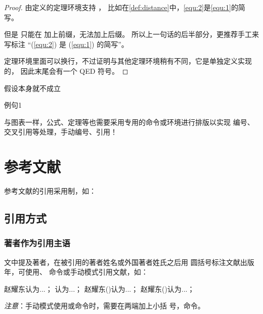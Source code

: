 \begin{proof}
由定义的定理环境支持 ，
比如在\autoref{def:distance}中，\autoref{equ:2}是\autoref{equ:1}的简写。

但是  只能在  加上前缀，无法加上后缀。
所以上一句话的后半部分，更推荐手工来写标注 “(\ref{equ:2}) 是 (\ref{equ:1}) 的简写”。

定理环境里面可以换行，不过证明与其他定理环境稍有不同，它是单独定义实现的，
因此末尾会有一个 QED 符号。
\end{proof}

\begin{assumption}
\label{assume:fail}
假设本身就不成立
\end{assumption}

\begin{lines}
\label{s1}
例句1
\end{lines}

与图表一样，公式、定理等也需要采用专用的命令或环境进行排版以实现
编号、交叉引用等处理，手动编号、引用！

\section{参考文献}
\label{sec:bib}
参考文献的引用采用制，如：

\subsection{引用方式}
\subsubsection{著者作为引用主语}

文中提及著者，在被引用的著者姓名或外国著者姓氏之后用
圆括号标注文献出版年，可使用、
命令或手动模式引用文献，如：

\begin{center}
  \begin{minipage}[h]{0.9\linewidth}
    \begin{texdemov}%
赵耀东认为...；
\textcite{赵耀东1998--}认为...；
赵耀东(\cite*{赵耀东1998--})认为...；
赵耀东(\citeyear{赵耀东1998--})认为...；
    \end{texdemov}
  \end{minipage}
\end{center}

\emph{注意}：手动模式使用或命令时，需要在两端加上小括
  号，命令。

